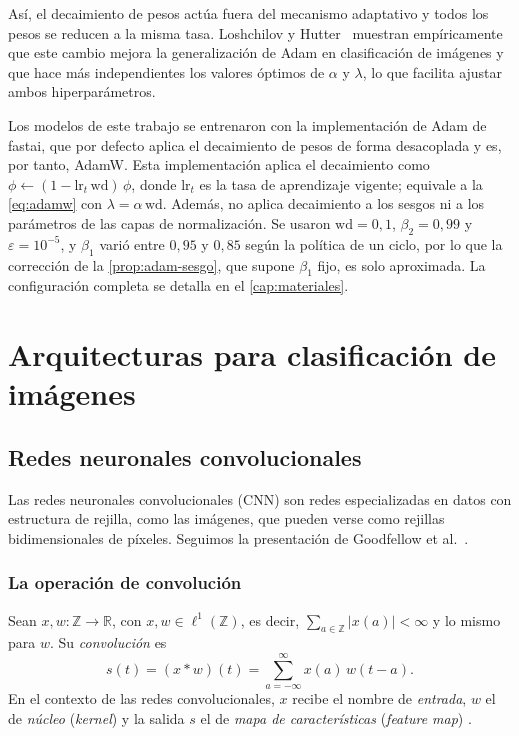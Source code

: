 Así, el decaimiento de pesos actúa fuera del mecanismo adaptativo y todos los
pesos se reducen a la misma tasa. Loshchilov y Hutter~\cite{loshchilov2019}
muestran empíricamente que este cambio mejora la generalización de Adam en
clasificación de imágenes y que hace más independientes los valores óptimos de
$\alpha$ y $\lambda$, lo que facilita ajustar ambos hiperparámetros.

\begin{observacion}\label{obs:adamw-fastai}
Los modelos de este trabajo se entrenaron con la implementación de Adam de
fastai, que por defecto aplica el decaimiento de pesos de forma desacoplada y es,
por tanto, AdamW. Esta implementación aplica el decaimiento como
$\phi \leftarrow (1 - \mathrm{lr}_t\,\mathrm{wd})\,\phi$, donde
$\mathrm{lr}_t$ es la tasa de aprendizaje vigente; equivale a la
\cref{eq:adamw} con $\lambda = \alpha\,\mathrm{wd}$. Además, no aplica
decaimiento a los sesgos ni a los parámetros de las capas de normalización. Se
usaron $\mathrm{wd} = 0{,}1$, $\beta_2 = 0{,}99$ y $\varepsilon = 10^{-5}$, y
$\beta_1$ varió entre $0{,}95$ y $0{,}85$ según la política de un ciclo, por lo
que la corrección de la \cref{prop:adam-sesgo}, que supone $\beta_1$ fijo, es
solo aproximada. La configuración completa se detalla en el \cref{cap:materiales}.
\end{observacion}

\section{Arquitecturas para clasificación de imágenes}\label{sec:arquitecturas}

\subsection{Redes neuronales convolucionales}\label{sec:cnn}

Las redes neuronales convolucionales (CNN) son redes especializadas en datos
con estructura de rejilla, como las imágenes, que pueden verse como rejillas
bidimensionales de píxeles. Seguimos la presentación de
Goodfellow et al.~\cite[cap.~9]{goodfellow2016deep}.

\subsubsection{La operación de convolución}

\begin{definicion}[Convolución]\label{def:convolucion}
Sean $x, w \colon \mathbb{Z} \to \mathbb{R}$, con
$x, w \in \ell^1(\mathbb{Z})$, es decir, $\sum_{a\in\mathbb{Z}} |x(a)| < \infty$
y lo mismo para $w$. Su \emph{convolución} es
\begin{equation}\label{eq:conv-discreta}
  s(t) = (x * w)(t) = \sum_{a=-\infty}^{\infty} x(a)\, w(t-a).
\end{equation}
En el contexto de las redes convolucionales, $x$ recibe el nombre de
\emph{entrada}, $w$ el de \emph{núcleo} (\emph{kernel}) y la salida $s$ el de
\emph{mapa de características} (\emph{feature map})
\cite[sec.~9.1]{goodfellow2016deep}.
\end{definicion}

